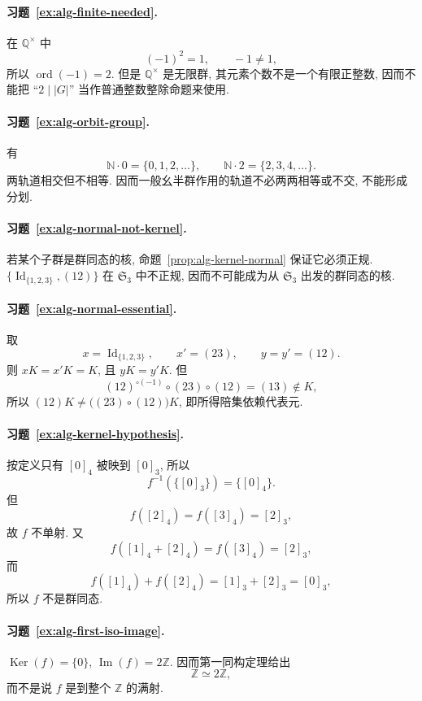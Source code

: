 \documentclass[usesamecnt, thmcnt=section, lang=cn, newtx, 10pt, scheme=chinese]{elegantbook}
\begin{document}
\paragraph*{习题~\ref{ex:alg-finite-needed}.}
在 $\mathbb Q^\times$ 中
\[
 (-1)^2=1,\qquad -1\neq1,
\]
所以 $\operatorname{ord}(-1)=2$. 但是 $\mathbb Q^\times$ 是无限群, 其元素个数不是一个有限正整数, 因而不能把 ``$2\mid |G|$'' 当作普通整数整除命题来使用.

\paragraph*{习题~\ref{ex:alg-orbit-group}.}
有
\[
 \mathbb N\cdot0=\{0,1,2,\ldots\},
 \qquad
 \mathbb N\cdot2=\{2,3,4,\ldots\}.
\]
两轨道相交但不相等. 因而一般幺半群作用的轨道不必两两相等或不交, 不能形成分划.


\paragraph*{习题~\ref{ex:alg-normal-not-kernel}.}
若某个子群是群同态的核, 命题~\ref{prop:alg-kernel-normal} 保证它必须正规. $\{\operatorname{Id}_{\{1,2,3\}},(12)\}$ 在 $\mathfrak S_3$ 中不正规, 因而不可能成为从 $\mathfrak S_3$ 出发的群同态的核.

\paragraph*{习题~\ref{ex:alg-normal-essential}.}
取
\[
 x=\operatorname{Id}_{\{1,2,3\}},\qquad x'=(23),\qquad y=y'=(12).
\]
则 $xK=x'K=K$, 且 $yK=y'K$. 但
\[
 (12)^{\circ(-1)}\circ(23)\circ(12)=(13)\notin K,
\]
所以 $(12)K\neq\bigl((23)\circ(12)\bigr)K$, 即所得陪集依赖代表元.

\paragraph*{习题~\ref{ex:alg-kernel-hypothesis}.}
按定义只有 $[0]_4$ 被映到 $[0]_3$, 所以
\[
 f^{-1}(\{[0]_3\})=\{[0]_4\}.
\]
但
\[
 f([2]_4)=f([3]_4)=[2]_3,
\]
故 $f$ 不单射. 又
\[
 f([1]_4+[2]_4)
 =f([3]_4)
 =[2]_3,
\]
而
\[
 f([1]_4)+f([2]_4)
 =[1]_3+[2]_3
 =[0]_3,
\]
所以 $f$ 不是群同态.

\paragraph*{习题~\ref{ex:alg-first-iso-image}.}
$\operatorname{Ker}(f)=\{0\}$, $\operatorname{Im}(f)=2\mathbb Z$. 因而第一同构定理给出
\[
 \mathbb Z\simeq2\mathbb Z,
\]
而不是说 $f$ 是到整个 $\mathbb Z$ 的满射.
\end{document}
